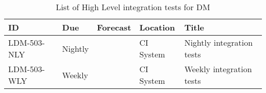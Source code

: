 \begin{longtable} {llllp{}}
\caption{List of High Level integration tests for DM \label{tab:schedule}} \\ %
\toprule
\textbf{ID} & \textbf{Due} & \textbf{Forecast} & \textbf{Location} & \textbf{Title} \\ \toprule

LDM-503-NLY &
Nightly &
	&
CI System &
Nightly integration tests \\

LDM-503-WLY &
Weekly &
	&
CI System &
Weekly integration tests \\



\end{longtable}
